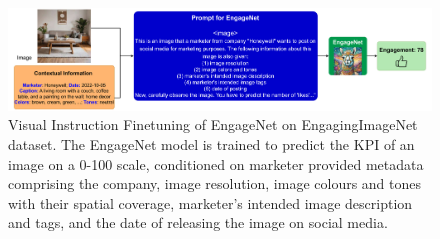  
     
 
 
 

 


 



\begin{figure}[!tb]
\centering
     \includegraphics[width=1\columnwidth]{images/boigllm_vift_compressed.pdf}
     \caption{\label{fig:EngageNet_training}
     Visual Instruction Finetuning of EngageNet on EngagingImageNet dataset. The EngageNet model is trained to predict the KPI of an image on a 0-100 scale, conditioned on marketer provided metadata comprising the company, image resolution, image colours and tones with their spatial coverage, marketer's intended image description and tags, and the date of releasing the image on social media.
     }
\end{figure}


